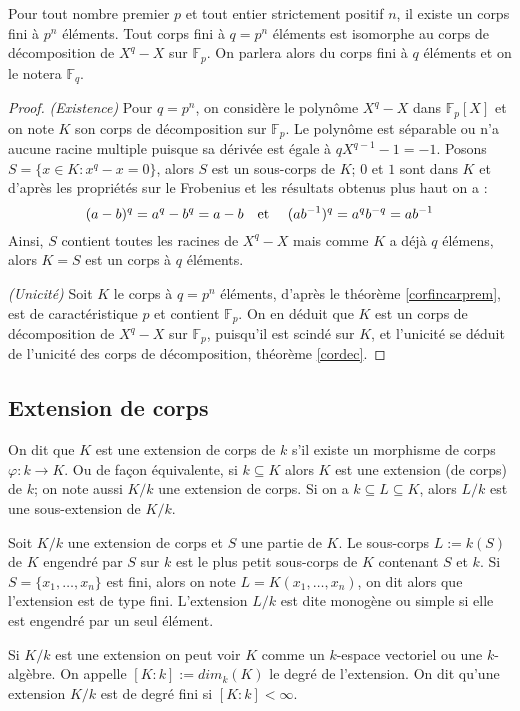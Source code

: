 \documentclass[a4paper]{article} %
\numberwithin{section}{part}
\numberwithin{equation}{section}
\newcommand\GF[1]{\mathbb{F}_{#1}}
\newcommand\etmath{\textup{\quad et \quad}}
\begin{document}
\begin{thm}
\label{thisomGF}
Pour tout nombre premier $p$ et tout entier strictement positif $n$, il existe 
un corps fini à $p^n$ éléments. Tout corps fini à $q = p^n$ éléments est 
isomorphe au corps de décomposition de $X^q - X$ sur $\GF{p}$. On parlera alors 
du corps fini à $q$ éléments et on le notera $\GF{q}$.
\end{thm}
\begin{proof}
\textit{(Existence)} Pour $q = p^n$, on considère le polynôme $X^q - X$ dans 
$\GF{p}[X]$ et on note $K$ son corps de décomposition sur $\GF{p}$. Le polynôme 
est séparable ou n'a aucune racine multiple puisque sa dérivée est égale à 
$qX^{q-1} - 1 = -1$. Posons $S = \lbrace x\in K : x^q - x = 0\rbrace$, alors $S$
est un sous-corps de $K$; $0$ et $1$ sont dans $K$ et d'après les propriétés sur
le Frobenius et les résultats obtenus plus haut on a :
\[(a - b)^q = a^q - b^q = a - b \etmath(ab^{-1})^q = a^qb^{-q} = ab^{-1}\]
Ainsi, $S$ contient toutes les racines de $X^q - X$ mais comme $K$ a déjà $q$
élémens, alors $K = S$ est un corps à $q$ éléments.\par
\textit{(Unicité)} Soit $K$ le corps à $q = p^n$ éléments, d'après le théorème
\ref{corfincarprem}, est de caractéristique $p$ et contient $\GF{p}$. On en
déduit que $K$ est un corps de décomposition de $X^q - X$ sur $\GF{p}$,
puisqu'il est scindé sur $K$, et l'unicité se déduit de l'unicité des corps de
décomposition, théorème \ref{cordec}.
\end{proof}

\subsection{Extension de corps}
\label{defdegext}
On dit que $K$ est une extension de corps de $k$ s'il existe un morphisme de 
corps $\varphi : k \to K$. Ou de façon équivalente, si $k \subseteq K$ alors $K$
est une extension (de corps) de $k$; on note aussi $K/k$ une extension de corps.
Si on a $k\subseteq L \subseteq K$, alors $L/k$ est une sous-extension de
$K/k$.\par
Soit $K/k$ une extension de corps et $S$ une partie de $K$. Le sous-corps $L := 
k(S)$ de $K$ engendré par $S$ sur $k$ est le plus petit sous-corps de $K$ 
contenant $S$ et $k$. Si $S = \lbrace x_1,\dots,x_n \rbrace$ est fini, alors on 
note $L = K(x_1,\dots,x_n)$, on dit alors que l'extension est de type fini. 
L'extension $L/k$ est dite monogène ou simple si elle est engendré par un seul 
élément.\par
Si $K/k$ est une extension on peut voir $K$ comme un $k$-espace vectoriel ou une
$k$-algèbre. On appelle $[K:k] := dim_k(K)$ le degré de l'extension. On dit 
qu'une extension $K/k$ est de degré fini si $[K:k] < \infty$.\par
\end{document}
